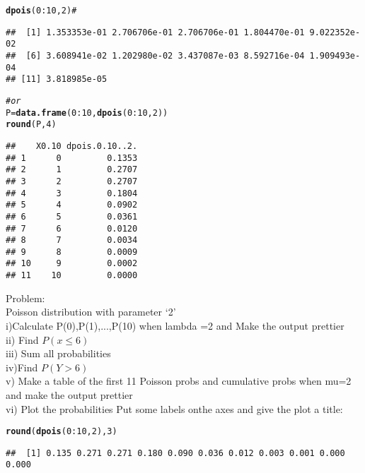 \documentclass{article}\usepackage[]{graphicx}\usepackage[]{xcolor}
\makeatletter
\newcommand{\hlnum}[1]{\textcolor[rgb]{0.686,0.059,0.569}{#1}}%
\newcommand{\hlcom}[1]{\textcolor[rgb]{0.678,0.584,0.686}{\textit{#1}}}%
\newcommand{\hlopt}[1]{\textcolor[rgb]{0,0,0}{#1}}%
\newcommand{\hldef}[1]{\textcolor[rgb]{0.345,0.345,0.345}{#1}}%
\newcommand{\hlkwb}[1]{\textcolor[rgb]{0.69,0.353,0.396}{#1}}%
\newcommand{\hlkwd}[1]{\textcolor[rgb]{0.737,0.353,0.396}{\textbf{#1}}}%
\newenvironment{kframe}{%
 \def\at@end@of@kframe{}%
 \ifinner\ifhmode%
  \def\at@end@of@kframe{\end{minipage}}%
  \begin{minipage}{\columnwidth}%
 \fi\fi%
 \def\FrameCommand##1{\hskip\@totalleftmargin \hskip-\fboxsep
 \colorbox{shadecolor}{##1}\hskip-\fboxsep
     \hskip-\linewidth \hskip-\@totalleftmargin \hskip\columnwidth}%
 \MakeFramed {\advance\hsize-\width
   \@totalleftmargin\z@ \linewidth\hsize
   \@setminipage}}%
 {\par\unskip\endMakeFramed%
 \at@end@of@kframe}
\newenvironment{knitrout}{}{} %
\makeatother
\begin{document}
\begin{knitrout}
\color{fgcolor}\begin{kframe}
\begin{alltt}
\hlkwd{dpois}\hldef{(}\hlnum{0}\hlopt{:}\hlnum{10}\hldef{,}\hlnum{2}\hldef{)} \hlcom{#}
\end{alltt}
\begin{verbatim}
##  [1] 1.353353e-01 2.706706e-01 2.706706e-01 1.804470e-01 9.022352e-02
##  [6] 3.608941e-02 1.202980e-02 3.437087e-03 8.592716e-04 1.909493e-04
## [11] 3.818985e-05
\end{verbatim}
\begin{alltt}
\hlcom{# or}
\hldef{P}\hlkwb{=}\hlkwd{data.frame}\hldef{(}\hlnum{0}\hlopt{:}\hlnum{10}\hldef{,}\hlkwd{dpois}\hldef{(}\hlnum{0}\hlopt{:}\hlnum{10}\hldef{,}\hlnum{2}\hldef{))}
\hlkwd{round} \hldef{(P,}\hlnum{4}\hldef{)}
\end{alltt}
\begin{verbatim}
##    X0.10 dpois.0.10..2.
## 1      0         0.1353
## 2      1         0.2707
## 3      2         0.2707
## 4      3         0.1804
## 5      4         0.0902
## 6      5         0.0361
## 7      6         0.0120
## 8      7         0.0034
## 9      8         0.0009
## 10     9         0.0002
## 11    10         0.0000
\end{verbatim}
\end{kframe}
\end{knitrout}
Problem:\\ Poisson distribution with parameter ‘2’\\
i)Calculate P(0),P(1),...,P(10) when lambda =2 and Make the output prettier\\
ii) Find $P(x \leq 6)$\\
iii) Sum all probabilities\\
iv)Find $P(Y>6)$\\
v) Make a table of the first 11 Poisson probs and cumulative probs when  mu=2 and
make the output prettier\\
vi) Plot the probabilities Put some labels onthe axes and give the plot a title:
\begin{knitrout}
\color{fgcolor}\begin{kframe}
\begin{alltt}
\hlkwd{round}\hldef{(}\hlkwd{dpois}\hldef{(}\hlnum{0}\hlopt{:}\hlnum{10}\hldef{,} \hlnum{2}\hldef{),} \hlnum{3}\hldef{)}
\end{alltt}
\begin{verbatim}
##  [1] 0.135 0.271 0.271 0.180 0.090 0.036 0.012 0.003 0.001 0.000 0.000
\end{verbatim}
\end{kframe}
\end{knitrout}
\end{document}

